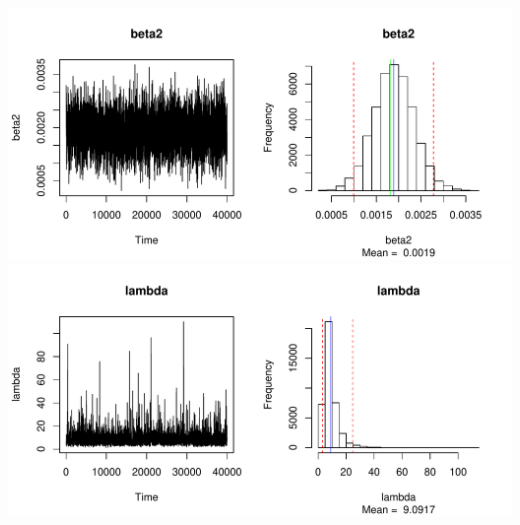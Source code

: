\documentclass[12pt]{article}
\begin{document}
\begin{enumerate}[(a)]
\begin{enumerate}[(i)]
	\includegraphics[scale = .7]{plot8.pdf} \\
	\includegraphics[scale = .7]{plot9.pdf} \\	
	\newline
	

\end{enumerate}
\end{enumerate}
\end{document}
